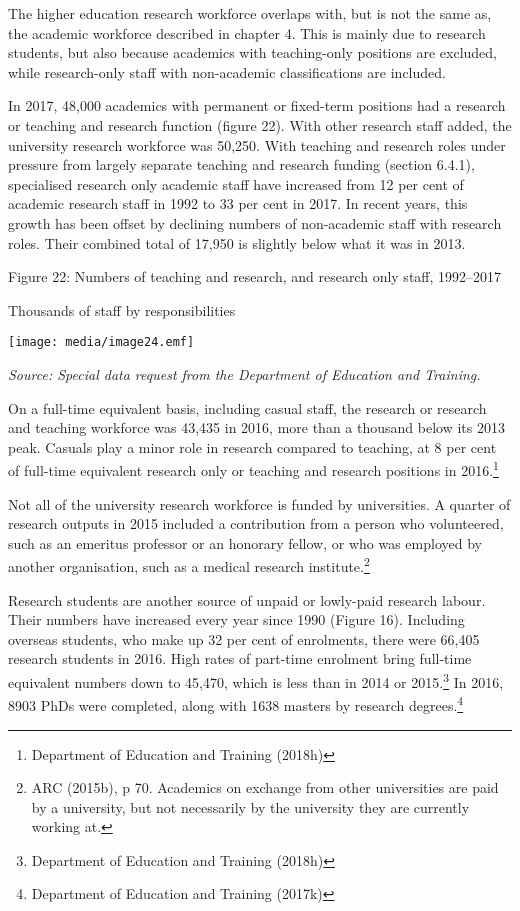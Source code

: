 \documentclass[]{book}
\begin{document}
The higher education research workforce overlaps with, but is not the same as, the academic workforce described in chapter 4. This is mainly due to research students, but also because academics with teaching-only positions are excluded, while research-only staff with non-academic classifications are included.

In 2017, 48,000 academics with permanent or fixed-term positions had a research or teaching and research function (figure 22). With other research staff added, the university research workforce was 50,250. With teaching and research roles under pressure from largely separate teaching and research funding (section 6.4.1), specialised research only academic staff have increased from 12 per cent of academic research staff in 1992 to 33 per cent in 2017. In recent years, this growth has been offset by declining numbers of non-academic staff with research roles. Their combined total of 17,950 is slightly below what it was in 2013.

\protect\hypertarget{_Ref345406636}{}{}Figure 22: Numbers of teaching and research, and research only staff, 1992--2017

Thousands of staff by responsibilities

\texttt{[image: media/image24.emf]}

\emph{Source: Special data request from the Department of Education and Training. }

On a full-time equivalent basis, including casual staff, the research or research and teaching workforce was 43,435 in 2016, more than a thousand below its 2013 peak. Casuals play a minor role in research compared to teaching, at 8 per cent of full-time equivalent research only or teaching and research positions in 2016.\footnote{Department of Education and Training (2018h)}

Not all of the university research workforce is funded by universities. A quarter of research outputs in 2015 included a contribution from a person who volunteered, such as an emeritus professor or an honorary fellow, or who was employed by another organisation, such as a medical research institute.\footnote{ARC (2015b), p 70. Academics on exchange from other universities are paid by a university, but not necessarily by the university they are currently working at.}

Research students are another source of unpaid or lowly-paid research labour. Their numbers have increased every year since 1990 (Figure 16). Including overseas students, who make up 32 per cent of enrolments, there were 66,405 research students in 2016. High rates of part-time enrolment bring full-time equivalent numbers down to 45,470, which is less than in 2014 or 2015.\footnote{Department of Education and Training (2018h)} In 2016, 8903 PhDs were completed, along with 1638 masters by research degrees.\footnote{Department of Education and Training (2017k)}
\end{document}
